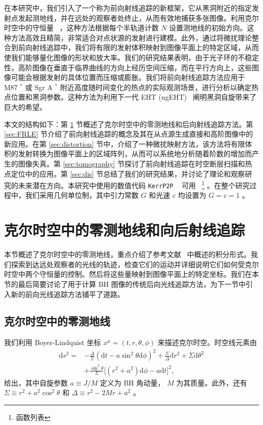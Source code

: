 \documentclass[aps,reprint,superscriptaddress,nofootinbib,floatfix,longbibliography,preprintnumbers]{revtex4-1}
\newcommand{\dd}{\mathrm{d}}
\begin{document}
在本研究中，我们引入了一个称为前向射线追踪的新框架，它从黑洞附近的指定发射点发起测地线，并在远处的观察者处终止，从而有效地捕获多张图像。利用克尔时空中的守恒量~    \cite{Carter:1968rr,Gralla:2019ceu,Lupsasca:2024wkp}    ，这种方法根据每个半轨道计数    $N$    设置测地线的初始方向。这种方法高效且精简，非常适合对点状源的发射进行建模。此外，通过将微扰理论整合到前向射线追踪中，我们将有限的发射体积映射到图像平面上的特定区域，从而使我们能够量化图像的形状和放大率。我们的研究结果表明，由于光子环的不稳定性，高阶图像在垂直于临界曲线的方向上经历空间压缩，而在平行方向上，这些图像可能会根据发射的具体位置而压缩或膨胀。我们将前向射线追踪方法应用于 M87    $^*$    或 Sgr A    $^*$    附近高度随时间变化的热点的实际观测场景，进行分析以确定热点位置和黑洞参数。这种方法为利用下一代 EHT (ngEHT)~    \cite{Emami:2022ydq,Johnson:2023ynn,Ayzenberg:2023hfw}    阐明黑洞自旋带来了巨大的希望。  

本文的结构如下：第    \ref{sec:NGBR}    节概述了克尔时空中的零测地线和后向射线追踪方法。第    \ref{sec:FRLE}    节介绍了前向射线追踪的概念及其在从点源生成直接和高阶图像中的新应用。在第    \ref{sec:distortion}    节中，介绍了一种微扰映射方法，该方法将有限体积的发射转换为图像平面上的区域阵列，从而可以系统地分析随着阶数的增加而产生的图像失真。第    \ref{sec:tomography}    节探讨了前向射线追踪在时空断层扫描和热点定位中的应用。第    \ref{sec:dis}    节总结了我们的研究结果，并讨论了理论和观察研究的未来潜在方向。本研究中使用的数值代码    \texttt{KerrP2P}    ~    \cite{KerrP2P}    可用~    \footnote{函数列表  }   。在整个研究过程中，我们采用几何单位制，其中引力常数    $G$    和光速    $c$    均设置为    $G=c=1$    。
   \section{克尔时空中的零测地线和向后射线追踪  }   
   \label{sec:NGBR}     

本节概述了克尔时空中的零测地线，重点介绍了参考文献~    \cite{Gralla:2019ceu,Gralla:2019drh}    中概述的积分形式。我们探索到达远处观察者的光线的轨迹，检查它们的运动并详细说明它们如何受克尔时空中两个守恒量的控制。然后将这些量映射到图像平面上的特定坐标。我们在本节的最后简要讨论了用于计算 BH 图像的传统后向光线追踪方法，为下一节中引入新的前向光线追踪方法铺平了道路。
   \subsection{克尔时空中的零测地线  }    
   \label{subsec:Trajectory}    我们利用 Boyer-Lindquist 坐标    $x^{\mu} = (t, r, \theta, \phi)$    来描述克尔时空。时空线元素由
   \begin{equation}
\begin{aligned}
\dd s^2=&-\frac{\Delta}{\Sigma}(\dd t-a\sin^2\theta\dd\phi)^2+\frac{\Sigma}{\Delta}\dd r^2+\Sigma\dd\theta^2 \\ 
&+\frac{\sin^2\theta}{\Sigma}\Big[(r^2+a^2)\dd\phi-a\dd t\Big]^2,
\end{aligned}
\label{eq:Kerr metric}
\end{equation}    给出，其中自旋参数    $a \equiv {J}/{M}$    定义为 BH 角动量，   $M$    为其质量。此外，还有    $\Sigma \equiv r^2 + a^2\cos^2\theta$    和    $\Delta \equiv r^2 - 2Mr + a^2$    。  
\end{document}
